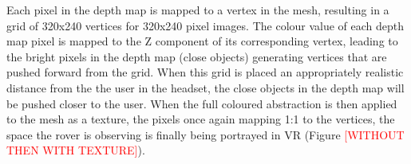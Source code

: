 Each pixel in the depth map is mapped to a vertex in the mesh, resulting in a grid of 320x240 vertices for 320x240 pixel images. The colour value of each depth map pixel is mapped to the Z component of its corresponding vertex, leading to the bright pixels in the depth map (close objects) generating vertices that are pushed forward from the grid. When this grid is placed an appropriately realistic distance from the the user in the headset, the close objects in the depth map will be pushed closer to the user. When the full coloured abstraction is then applied to the mesh as a texture, the pixels once again mapping 1:1 to the vertices, the space the rover is observing is finally being portrayed in VR (Figure \textcolor{red}{[WITHOUT THEN WITH TEXTURE]}).